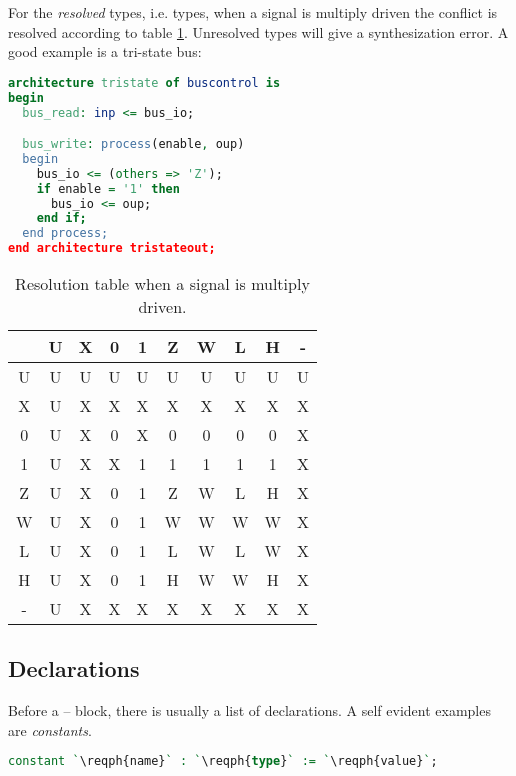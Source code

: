 For the \emph{resolved} types, i.e.  types, when a signal is
multiply driven the conflict is resolved according to table
\ref{tab:std-logic-1164-resolve}.  Unresolved types will give a synthesization
error.  A good example is a tri-state bus: 
\begin{lstlisting}[language=vhdl]
architecture tristate of buscontrol is
begin
  bus_read: inp <= bus_io;

  bus_write: process(enable, oup)
  begin
    bus_io <= (others => 'Z');
    if enable = '1' then
      bus_io <= oup;
    end if;
  end process;
end architecture tristateout;
\end{lstlisting}
\begin{table}[h]
  \centering
  {
    \ttfamily
    \begin{tabular}{c|ccccccccc} 
      \toprule
      & U & X & 0 & 1 & Z & W & L & H & - \\
      \midrule
      U & U & U & U & U & U & U & U & U & U \\
      X & U & X & X & X & X & X & X & X & X \\
      0 & U & X & 0 & X & 0 & 0 & 0 & 0 & X \\
      1 & U & X & X & 1 & 1 & 1 & 1 & 1 & X \\
      Z & U & X & 0 & 1 & Z & W & L & H & X \\
      W & U & X & 0 & 1 & W & W & W & W & X \\
      L & U & X & 0 & 1 & L & W & L & W & X \\
      H & U & X & 0 & 1 & H & W & W & H & X \\
      - & U & X & X & X & X & X & X & X & X \\
      \bottomrule
    \end{tabular}
  }
  \caption{
    Resolution table when a  signal is multiply driven.
    \label{tab:std-logic-1164-resolve}
  }
\end{table}

\subsection{Declarations} \label{sec:declarations}
Before a  --  block, there is usually a list of declarations.
A self evident examples are \emph{constants}.
\begin{lstlisting}[language=vhdl]
constant `\reqph{name}` : `\reqph{type}` := `\reqph{value}`;
\end{lstlisting}

